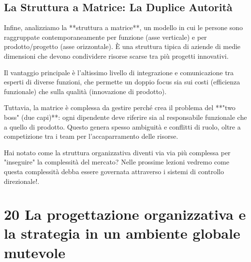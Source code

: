 \documentclass[a4paper,10pt]{article}
\begin{document}
\subsection*{La Struttura a Matrice: La Duplice Autorità}

Infine, analizziamo la **struttura a matrice**, un modello in cui le persone sono raggruppate contemporaneamente per funzione (asse verticale) e per prodotto/progetto (asse orizzontale). È una struttura tipica di aziende di medie dimensioni che devono condividere risorse scarse tra più progetti innovativi.

Il vantaggio principale è l'altissimo livello di integrazione e comunicazione tra esperti di diverse funzioni, che permette un doppio focus sia sui costi (efficienza funzionale) che sulla qualità (innovazione di prodotto).

Tuttavia, la matrice è complessa da gestire perché crea il problema del **"two boss" (due capi)**: ogni dipendente deve riferire sia al responsabile funzionale che a quello di prodotto. Questo genera spesso ambiguità e conflitti di ruolo, oltre a competizione tra i team per l'accaparramento delle risorse.

Hai notato come la struttura organizzativa diventi via via più complessa per "inseguire" la complessità del mercato? Nelle prossime lezioni vedremo come questa complessità debba essere governata attraverso i sistemi di controllo direzionale!.

\section*{20 La progettazione organizzativa e la strategia in un ambiente globale mutevole}
\end{document}
